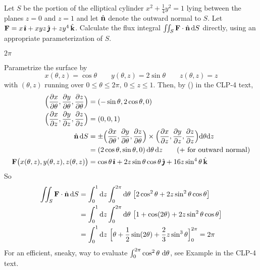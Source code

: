 \begin{question}[M317 2001A] %
Let $S$ be the portion of the elliptical cylinder $x^2+\frac{1}{4}y^2=1$
lying between the planes $z=0$ and $z=1$ and let $\hat{\mathbf{n}}$ denote the outward
normal to $S$. Let $\mathbf{F}=x\,\hat{\pmb{\imath}}+xyz\,\hat{\pmb{\jmath}}+zy^4\,\hat{\mathbf{k}}$.  
Calculate the flux integral
$\iint_S \mathbf{F}\cdot\hat{\mathbf{n}}\, \mathrm{d}S$ directly, using an 
appropriate parameterization of $S$.
\end{question}


\begin{answer} 
$2\pi$
\end{answer}

\begin{solution} 
Parametrize the surface by
$$
x(\theta,z)=\cos\theta\qquad
y(\theta,z)=2\sin\theta\qquad
z(\theta,z)=z
$$
with $(\theta,z)$ running over 
$0\le \theta\le 2\pi,\ 0\le z\le 1$. Then,
by () in the CLP-4 text,
\begin{align*}
\Big(\pdiff{x}{\theta},\pdiff{y}{\theta},
\pdiff{z}{\theta}\Big)
&=(-\sin\theta,2\cos\theta,0)\\
\Big(\pdiff{x}{z},\pdiff{y}{z},
\pdiff{z}{z}\Big)
&=(0, 0,1)\\
\hat\vn\, \dee{S}
&=
\pm \Big(\pdiff{x}{\theta},\pdiff{y}{\theta},
\pdiff{z}{\theta}\Big)
\times\Big(\pdiff{x}{z},\pdiff{y}{z},
\pdiff{z}{z}\Big)\dee{\theta} \dee{z}\\
&=(2\cos\theta,\sin\theta,0)\,\dee{\theta}\,\dee{z}
\qquad\text{($+$ for outward normal)}\\
\vF\big(x(\theta,z),y(\theta,z),z(\theta,z)\big)
    &=\cos\theta\,\hi+2z\sin\theta\cos\theta\,\hj+16z\sin^4\theta\,\hk
\end{align*}
 So
\begin{align*}
\dblInt_S \vF\cdot\hn\, \dee{S}
&=\int_0^1 \dee{z}\int_0^{2\pi}\dee{\theta}\ \big[2\cos^2\theta+2z\sin^2\theta\cos\theta\big] \\
&=\int_0^1 \dee{z}\int_0^{2\pi}\dee{\theta}\ \big[1+\cos(2\theta)+2z\sin^2\theta\cos\theta\big] \\
&=\int_0^1 \dee{z}\  \Big[\theta+\frac{1}{2} \sin(2\theta)+\frac{2}{3}z\sin^3\theta\Big]_0^{2\pi}
=2\pi
\end{align*}
For an efficient, sneaky, way to evaluate 
$\int_0^{2\pi} \cos^2 \theta\ \mathrm{d}\theta$, see Example
 in the CLP-4 text.
\end{solution}


